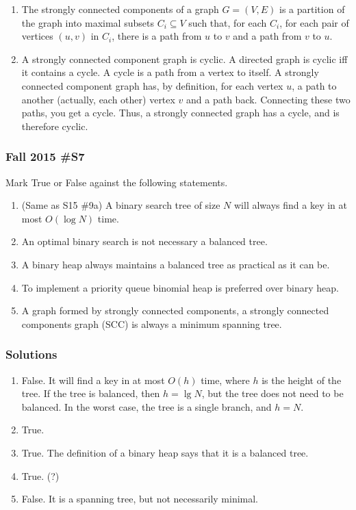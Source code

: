 \begin{enumerate}
	\item The strongly connected components of a graph $G=(V,E)$ is a partition of the graph into maximal subsets $C_i \subseteq V$ such that, for each $C_i$, for each pair of vertices $(u,v)$ in $C_i$, there is a path from $u$ to $v$ and a path from $v$ to $u$.  
	\item A strongly connected component graph is cyclic.  A directed graph is cyclic iff it contains a cycle.  A cycle is a path from a vertex to itself.  A strongly connected component graph has, by definition, for each vertex $u$, a path to another (actually, each other) vertex $v$ and a path back.  Connecting these two paths, you get a cycle.  Thus, a strongly connected graph has a cycle, and is therefore cyclic.  
\end{enumerate}

\subsubsection{Fall 2015 \#S7}

Mark True or False against the following statements.
	\begin{enumerate}[label=\alph*.]
		\item  (Same as S15 \#9a) A binary search tree of size $N$ will always find a key in at most $O(\log N)$ time.
		\item An optimal binary search is not necessary a balanced tree.
		\item A binary heap always maintains a balanced tree as practical as it can be.
		\item To implement a priority queue binomial heap is preferred over binary heap.
		\item A graph formed by strongly connected components, a strongly connected components graph (SCC) is always a minimum spanning tree.  
	\end{enumerate}
	
\subsubsection{Solutions}

\begin{enumerate}[label=\alph*.]
	\item False.  It will find a key in at most $O(h)$ time, where $h$ is the height of the tree.  If the tree is balanced, then $h = \lg N$, but the tree does not need to be balanced.  In the worst case, the tree is a single branch, and $h = N$.  
	\item True.
	\item True.  The definition of a binary heap says that it is a balanced tree.  
	\item True. (?)
	\item False.  It is a spanning tree, but not necessarily minimal.  
\end{enumerate}

